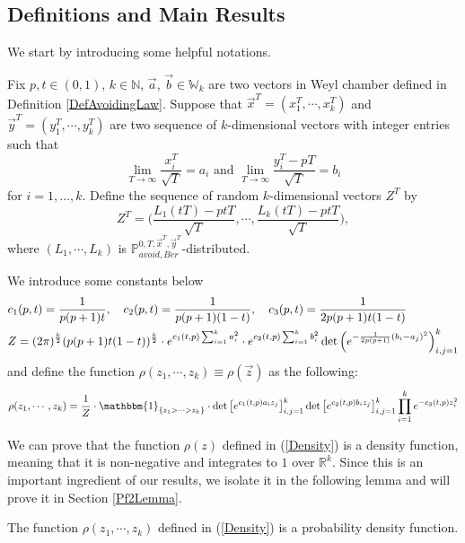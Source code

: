 \subsection{Definitions and Main Results}{\label{DefMainRes}}
We start by introducing some helpful notations.
\begin{definition}\label{DefScaled}
	Fix $p,t\in(0,1)$, $k\in\mathbb{N}$, $\vec{a}$, $\vec{b}\in \mathbb{W}_{k}$ are two vectors in Weyl chamber defined in Definition \ref{DefAvoidingLaw}. Suppose that $\vec{x}^{T}=(x_{1}^{T},\cdots,x_{k}^{T})$ and $\vec{y}^{T}=(y_{1}^{T},\cdots,y_{k}^{T})$ are two sequence of $k$-dimensional vectors with integer entries such that $$\lim_{T\rightarrow\infty}\frac{x_{i}^{T}}{\sqrt{T}}=a_{i} \text{ and } \lim_{T\rightarrow\infty}\frac{y_{i}^{T}-pT}{\sqrt{T}}=b_{i}$$ for $i=1,\dots,k$. Define the sequence of random $k$-dimensional vectors $Z^{T}$ by $$Z^{T}=\big(\frac{L_{1}(tT)-ptT}{\sqrt{T}},\cdots,\frac{L_{k}(tT)-ptT}{\sqrt{T}}\big),$$ where $(L_{1},\cdots,L_{k})$ is $\mathbb{P}^{0,T,\vec{x}^{T},\vec{y}^{T}}_{avoid,Ber}$-distributed.
\end{definition}

We introduce some constants below
\begin{align}{\label{WCconst}}
	\begin{split}
	&c_{1}(p,t)=\frac{1}{p(p+1)t}, \quad c_{2}(p,t)=\frac{1}{p(p+1)(1-t)}, \quad c_{3}(p,t)=\frac{1}{2p(p+1)t(1-t)}\\
	&Z=(2\pi)^{\frac{k}{2}}(p(p+1)t(1-t))^{\frac{k}{2}}\cdot e^{c_{1}(t,p)\sum_{i=1}^{k}a_{i}^{2}}\cdot e^{c_{2}(t,p)\sum_{i=1}^{k}b_{i}^{2}}\det\left(e^{-\frac{1}{2p(p+1)}(b_{i}-a_{j})^{2}}\right)_{i,j=1}^{k}
	\end{split}
\end{align}
and define the function $\rho(z_{1},\cdots, z_{k})\equiv\rho(\vec{z})$ as the following:
\begin{align}{\label{Density}}
	\rho(z_{1},\cdots,z_{k})=\frac{1}{Z}\cdot \mathbbm{1}_{\{z_{1}>\cdots >z_{k}\}}\cdot \det\big[e^{c_{1}(t,p)a_{i}z_{j}}\big]_{i,j=1}^{k}\det\big[e^{c_{2}(t,p)b_{i}z_{j}}\big]_{i,j=1}^{k}\prod_{i=1}^{k}e^{-c_{3}(t,p)z_{i}^{2}}
\end{align}

We can prove that the function $\rho(z)$ defined in (\ref{Density}) is a density function, meaning that it is non-negative and integrates to $1$ over $\mathbb{R}^{k}$. Since this is an important ingredient of our results, we isolate it in the following lemma and will prove it in Section \ref{Pf2Lemma}.
\begin{lemma}{\label{LemmaDensity}}
	The function $\rho(z_{1},\cdots,z_{k})$ defined in (\ref{Density}) is a probability density function.
\end{lemma}


